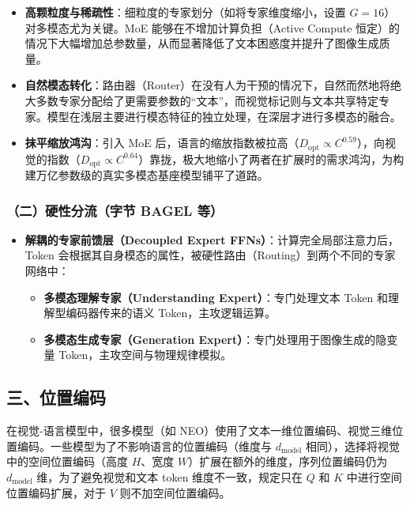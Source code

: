 \begin{itemize}
\tightlist
\item
  \textbf{高颗粒度与稀疏性}：细粒度的专家划分（如将专家维度缩小，设置 \(G=16\)）对多模态尤为关键。MoE 能够在不增加计算负担（Active Compute 恒定）的情况下大幅增加总参数量，从而显著降低了文本困惑度并提升了图像生成质量。
\item
  \textbf{自然模态转化}：路由器（Router）在没有人为干预的情况下，自然而然地将绝大多数专家分配给了更需要参数的``文本''，而视觉标记则与文本共享特定专家。模型在浅层主要进行模态特征的独立处理，在深层才进行多模态的融合。
\item
  \textbf{抹平缩放鸿沟}：引入 MoE 后，语言的缩放指数被拉高（\(D_{\mathrm{opt}}\propto C^{0.59}\)），向视觉的指数（\(D_{\mathrm{opt}}\propto C^{0.64}\)）靠拢，极大地缩小了两者在扩展时的需求鸿沟，为构建万亿参数级的真实多模态基座模型铺平了道路。
\end{itemize}

\hypertarget{ux4e8cux786cux6027ux5206ux6d41ux5b57ux8282-bagel-ux7b49}{%
\subsubsection{（二）硬性分流（字节 BAGEL 等）}\label{ux4e8cux786cux6027ux5206ux6d41ux5b57ux8282-bagel-ux7b49}}

\begin{itemize}
\tightlist
\item
  \textbf{解耦的专家前馈层（Decoupled Expert FFNs）}：计算完全局部注意力后，Token 会根据其自身模态的属性，被硬性路由（Routing）到两个不同的专家网络中：

  \begin{itemize}
  \tightlist
  \item
    \textbf{多模态理解专家（Understanding Expert）}：专门处理文本 Token 和理解型编码器传来的语义 Token，主攻逻辑运算。
  \item
    \textbf{多模态生成专家（Generation Expert）}：专门处理用于图像生成的隐变量 Token，主攻空间与物理规律模拟。
  \end{itemize}
\end{itemize}

\hypertarget{ux4e09ux4f4dux7f6eux7f16ux7801}{%
\subsection{三、位置编码}\label{ux4e09ux4f4dux7f6eux7f16ux7801}}

在视觉-语言模型中，很多模型（如 NEO）使用了文本一维位置编码、视觉三维位置编码。一些模型为了不影响语言的位置编码（维度与 \(d_{\mathrm{model}}\) 相同），选择将视觉中的空间位置编码（高度 \(H\)、宽度 \(W\)）扩展在额外的维度，序列位置编码仍为 \(d_{\mathrm{model}}\) 维，为了避免视觉和文本 token 维度不一致，规定只在 \(Q\) 和 \(K\) 中进行空间位置编码扩展，对于 \(V\) 则不加空间位置编码。

